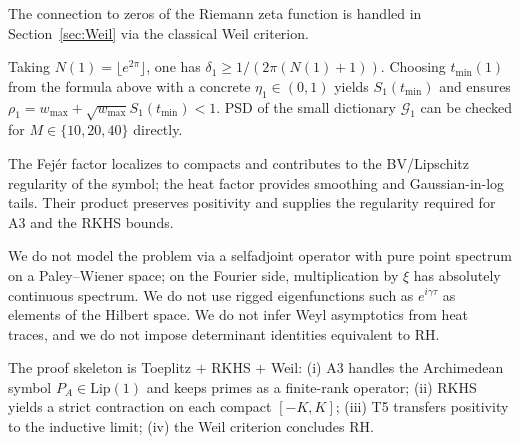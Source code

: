 \begin{remark}
The connection to zeros of the Riemann zeta function is handled in Section~\ref{sec:Weil} via the classical Weil criterion.
\end{remark}

\begin{remark}[Example at $K=1$]
Taking $N(1)=\lfloor e^{2\pi}\rfloor$, one has $\delta_1\ge 1/(2\pi(N(1)+1))$. Choosing $t_{\min}(1)$ from the formula above with a concrete $\eta_1\in(0,1)$ yields $S_1(t_{\min})$ and ensures $\rho_1=w_{\max}+\sqrt{w_{\max}} S_1(t_{\min})<1$. PSD of the small dictionary $\mathcal G_1$ can be checked for $M\in\{10,20,40\}$ directly.
\end{remark}

\begin{remark}
The Fej\'er factor localizes to compacts and contributes to the BV/Lipschitz regularity of the symbol; the heat factor provides smoothing and Gaussian-in-log tails. Their product preserves positivity and supplies the regularity required for A3 and the RKHS bounds.
\end{remark}

\begin{remark}
We do not model the problem via a selfadjoint operator with pure point spectrum on a Paley--Wiener space; on the Fourier side, multiplication by $\xi$ has absolutely continuous spectrum. We do not use rigged eigenfunctions such as $e^{i\gamma \tau}$ as elements of the Hilbert space. We do not infer Weyl asymptotics from heat traces, and we do not impose determinant identities equivalent to RH.
\end{remark}

\begin{remark}
The proof skeleton is Toeplitz $+$ RKHS $+$ Weil: (i) A3 handles the Archimedean symbol $P_A\in\mathrm{Lip}(1)$ and keeps primes as a finite-rank operator; (ii) RKHS yields a strict contraction on each compact $[-K,K]$; (iii) T5 transfers positivity to the inductive limit; (iv) the Weil criterion concludes RH.
\end{remark}
